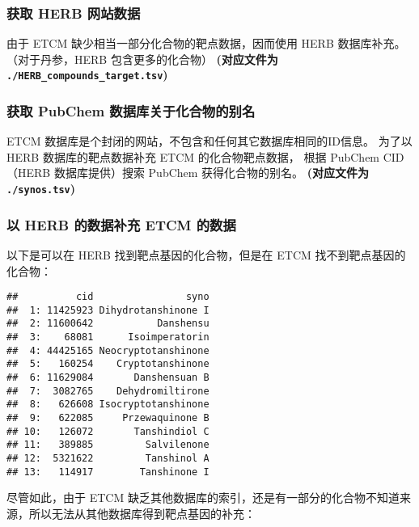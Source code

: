 \documentclass[
]{article}
\begin{document}
\hypertarget{ux83b7ux53d6-herb-ux7f51ux7ad9ux6570ux636e}{%
\subsubsection{获取 HERB 网站数据}\label{ux83b7ux53d6-herb-ux7f51ux7ad9ux6570ux636e}}

由于 ETCM 缺少相当一部分化合物的靶点数据，因而使用 HERB 数据库补充。
（对于丹参，HERB 包含更多的化合物）
\textbf{(对应文件为 \texttt{./HERB\_compounds\_target.tsv})}

\hypertarget{ux83b7ux53d6-pubchem-ux6570ux636eux5e93ux5173ux4e8eux5316ux5408ux7269ux7684ux522bux540d}{%
\subsubsection{获取 PubChem 数据库关于化合物的别名}\label{ux83b7ux53d6-pubchem-ux6570ux636eux5e93ux5173ux4e8eux5316ux5408ux7269ux7684ux522bux540d}}

ETCM 数据库是个封闭的网站，不包含和任何其它数据库相同的ID信息。
为了以 HERB 数据库的靶点数据补充 ETCM 的化合物靶点数据，
根据 PubChem CID （HERB 数据库提供）搜索 PubChem 获得化合物的别名。
\textbf{(对应文件为 \texttt{./synos.tsv})}

\hypertarget{ux4ee5-herb-ux7684ux6570ux636eux8865ux5145-etcm-ux7684ux6570ux636e}{%
\subsubsection{以 HERB 的数据补充 ETCM 的数据}\label{ux4ee5-herb-ux7684ux6570ux636eux8865ux5145-etcm-ux7684ux6570ux636e}}

以下是可以在 HERB 找到靶点基因的化合物，但是在 ETCM 找不到靶点基因的化合物：

\begin{verbatim}
##          cid                syno
##  1: 11425923 Dihydrotanshinone I
##  2: 11600642           Danshensu
##  3:    68081      Isoimperatorin
##  4: 44425165 Neocryptotanshinone
##  5:   160254    Cryptotanshinone
##  6: 11629084       Danshensuan B
##  7:  3082765    Dehydromiltirone
##  8:   626608 Isocryptotanshinone
##  9:   622085     Przewaquinone B
## 10:   126072       Tanshindiol C
## 11:   389885         Salvilenone
## 12:  5321622         Tanshinol A
## 13:   114917        Tanshinone I
\end{verbatim}

尽管如此，由于 ETCM 缺乏其他数据库的索引，还是有一部分的化合物不知道来源，所以无法从其他数据库得到靶点基因的补充：
\end{document}
